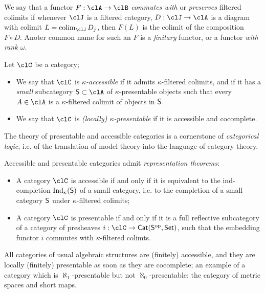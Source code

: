 We say that a functor $F : \clA \to \clB$ \emph{commutes with} or \emph{preserves} filtered colimits if whenever $\clJ$ is a filtered category, $D : \clJ \to \clA$ is a diagram with colimit $L=\colim_\clJ D_j$, then $F(L)$ is the colimit of the composition $F\circ D$. Anoter common name for such an $F$ is a \emph{finitary} functor, or a functor \emph{with rank $\omega$}.
\begin{definition}\label{accepre}
	Let $\clC$ be a category;
	\begin{itemize}
		\item We say that $\clC$ is \emph{$\kappa$\hyp{}accessible} if it admits $\kappa$\hyp{}filtered colimits, and if it has a \emph{small} subcategory $\cate{S}\subset \clA$ of $\kappa$\hyp{}presentable objects such that every $A\in\clA$ is a $\kappa$\hyp{}filtered colimit of objects in $\mathsf{S}$.
		\item We say that $\clC$ is \emph{(locally) $\kappa$\hyp{}presentable} if it is accessible and cocomplete.
	\end{itemize}
	The theory of presentable and accessible categories is a cornerstone of \emph{categorical logic}, i.e. of the translation of model theory into the language of category theory.

	Accessible and presentable categories admit \emph{representation theorems}:
	\begin{itemize}
		\item A category $\clC$ is accessible if and only if it is equivalent to the ind\hyp{}completion $\text{Ind}_\kappa(\mathsf{S})$ of a small category, i.e. to the completion of a small category $\mathsf{S}$ under  $\kappa$\hyp{}filtered colimits;
		\item A category $\clC$ is presentable if and only if it is a full reflective subcategory of a category of presheaves $i : \clC \to \Cat(\cate{S}^\op,\Set)$, such that the embedding functor $i$ commutes with $\kappa$\hyp{}filtered colimts.
	\end{itemize}
\end{definition}
All categories of usual algebraic structures are (finitely) accessible, and they are locally (finitely) presentable as soon as they are cocomplete; an example of a category which is $\aleph_1$\hyp{}presentable but not $\aleph_0$\hyp{}presentable: the category of metric spaces and short maps.

